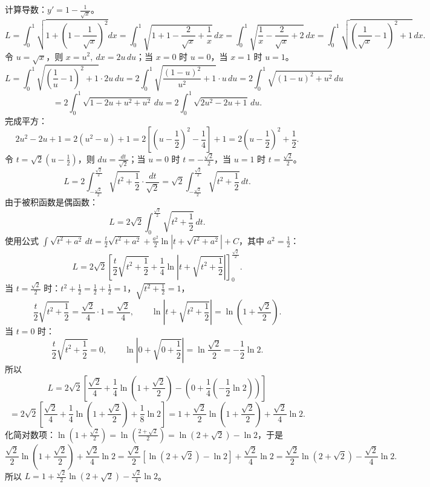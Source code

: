 计算导数：\(y'=1-\frac{1}{\sqrt{x}}\)。
\[ L=\int_{0}^{1}\sqrt{1+\left(1-\frac{1}{\sqrt{x}}\right)^{2}}dx=\int_{0}^{1}\sqrt{1+1-\frac{2}{\sqrt{x}}+\frac{1}{x}}\,dx=\int_{0}^{1}\sqrt{\frac{1}{x}-\frac{2}{\sqrt{x}}+2}\,dx=\int_{0}^{1}\sqrt{\left(\frac{1}{\sqrt{x}}-1\right)^{2}+1}\,dx. \]
令 \(u=\sqrt{x}\)，则 \(x=u^{2},\ dx=2u\,du\)；当 \(x=0\) 时 \(u=0\)，当 \(x=1\) 时 \(u=1\)。
\[ L=\int_{0}^{1}\sqrt{\left(\frac{1}{u}-1\right)^{2}+1}\cdot2u\,du=2\int_{0}^{1}\sqrt{\frac{(1-u)^{2}}{u^{2}}+1}\cdot u\,du=2\int_{0}^{1}\sqrt{(1-u)^{2}+u^{2}}\,du \]
\[ =2\int_{0}^{1}\sqrt{1-2u+u^{2}+u^{2}}\,du=2\int_{0}^{1}\sqrt{2u^{2}-2u+1}\,du. \]
完成平方：
\[ 2u^{2}-2u+1=2(u^{2}-u)+1=2\left[\left(u-\frac{1}{2}\right)^{2}-\frac{1}{4}\right]+1=2\left(u-\frac{1}{2}\right)^{2}+\frac{1}{2}. \]
令 \(t=\sqrt{2}\left(u-\frac{1}{2}\right)\)，则 \(du=\frac{dt}{\sqrt2}\)；当 \(u=0\) 时 \(t=-\frac{\sqrt2}{2}\)，当 \(u=1\) 时 \(t=\frac{\sqrt2}{2}\)。
\[ L=2\int_{-\frac{\sqrt2}{2}}^{\frac{\sqrt2}{2}}\sqrt{t^{2}+\frac{1}{2}}\cdot\frac{dt}{\sqrt2}=\sqrt2\int_{-\frac{\sqrt2}{2}}^{\frac{\sqrt2}{2}}\sqrt{t^{2}+\frac{1}{2}}\,dt. \]
由于被积函数是偶函数：
\[ L=2\sqrt2\int_{0}^{\frac{\sqrt2}{2}}\sqrt{t^{2}+\frac{1}{2}}\,dt. \]
使用公式 \(\int\sqrt{t^{2}+a^{2}}\,dt=\frac{t}{2}\sqrt{t^{2}+a^{2}}+\frac{a^{2}}{2}\ln\left|t+\sqrt{t^{2}+a^{2}}\right|+C\)，其中 \(a^{2}=\frac{1}{2}\)：
\[ L=2\sqrt2\left[\frac{t}{2}\sqrt{t^{2}+\frac{1}{2}}+\frac{1}{4}\ln\left|t+\sqrt{t^{2}+\frac{1}{2}}\right|\right]_{0}^{\frac{\sqrt2}{2}}. \]
当 \(t=\frac{\sqrt2}{2}\) 时：\(t^{2}+\frac{1}{2}=\frac{1}{2}+\frac{1}{2}=1\)，\(\sqrt{t^{2}+\frac{1}{2}}=1\)，
\[ \frac{t}{2}\sqrt{t^{2}+\frac{1}{2}}=\frac{\sqrt2}{4}\cdot1=\frac{\sqrt2}{4},\qquad \ln\left|t+\sqrt{t^{2}+\frac{1}{2}}\right|=\ln\left(1+\frac{\sqrt2}{2}\right). \]
当 \(t=0\) 时：
\[ \frac{t}{2}\sqrt{t^{2}+\frac{1}{2}}=0,\qquad \ln\left|0+\sqrt{0+\frac{1}{2}}\right|=\ln\frac{\sqrt2}{2}=-\frac{1}{2}\ln2. \]
所以
\[ L=2\sqrt2\left[\frac{\sqrt2}{4}+\frac{1}{4}\ln\left(1+\frac{\sqrt2}{2}\right)-\left(0+\frac{1}{4}\left(-\frac{1}{2}\ln2\right)\right)\right] \]
\[ =2\sqrt2\left[\frac{\sqrt2}{4}+\frac{1}{4}\ln\left(1+\frac{\sqrt2}{2}\right)+\frac{1}{8}\ln2\right]=1+\frac{\sqrt2}{2}\ln\left(1+\frac{\sqrt2}{2}\right)+\frac{\sqrt2}{4}\ln2. \]
化简对数项：\(\ln\left(1+\frac{\sqrt2}{2}\right)=\ln\left(\frac{2+\sqrt2}{2}\right)=\ln(2+\sqrt2)-\ln2\)，于是
\[ \frac{\sqrt2}{2}\ln\left(1+\frac{\sqrt2}{2}\right)+\frac{\sqrt2}{4}\ln2=\frac{\sqrt2}{2}\left[\ln(2+\sqrt2)-\ln2\right]+\frac{\sqrt2}{4}\ln2=\frac{\sqrt2}{2}\ln(2+\sqrt2)-\frac{\sqrt2}{4}\ln2. \]
所以 \(L=1+\frac{\sqrt2}{2}\ln(2+\sqrt2)-\frac{\sqrt2}{4}\ln2\)。

